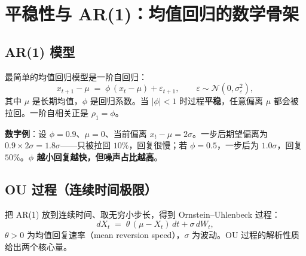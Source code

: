 \documentclass[UTF8,11pt]{ctexart}
\begin{document}
\section{平稳性与 AR(1)：均值回归的数学骨架}

\subsection{AR(1) 模型}
最简单的均值回归模型是一阶自回归：
\begin{equation}
x_{t+1} - \mu \;=\; \phi\,(x_t - \mu) + \varepsilon_{t+1},
\qquad \varepsilon \sim \mathcal{N}(0,\sigma_\varepsilon^2),
\end{equation}
其中 $\mu$ 是长期均值，$\phi$ 是回归系数。当 $|\phi|<1$ 时过程\textbf{平稳}，任意偏离 $\mu$ 都会被拉回。一阶自相关正是 $\rho_1 = \phi$。

\textbf{数字例}：设 $\phi = 0.9$、$\mu=0$、当前偏离 $x_t-\mu = 2\sigma$。一步后期望偏离为 $0.9\times 2\sigma = 1.8\sigma$——只被拉回 $10\%$，回复很慢；若 $\phi = 0.5$，一步后为 $1.0\sigma$，回复 $50\%$。\textbf{$\phi$ 越小回复越快，但噪声占比越高}。

\subsection{OU 过程（连续时间极限）}
把 AR(1) 放到连续时间、取无穷小步长，得到 Ornstein--Uhlenbeck 过程：
\begin{equation}
dX_t \;=\; \theta\,(\mu - X_t)\,dt + \sigma\,dW_t,
\end{equation}
$\theta>0$ 为均值回复速率（mean reversion speed），$\sigma$ 为波动。OU 过程的解析性质给出两个核心量。
\end{document}
